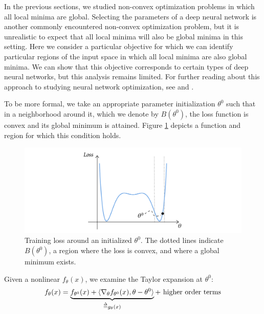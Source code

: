 


In the previous sections, we studied non-convex optimization problems in which all local minima are global. Selecting the parameters of a deep neural network is another commonly encountered non-convex optimization problem, but it is unrealistic to expect that all local minima will also be global minima in this setting. Here we consider a particular objective for which we can identify particular regions of the input space in which all local minima are also global minima. We can show that this objective corresponds to certain types of deep neural networks, but this analysis remains limited. For further reading about this approach to studying neural network optimization, see \cite{liang2018adding} and \cite{du2019gradient}.


To be more formal, we take an appropriate parameter initialization $\theta^0$ such that in a neighborhood around it, which we denote by $B(\theta^0)$, the loss function is convex and its global minimum is attained. Figure \ref{lec13:fig:NTKapproach} depicts a function and region for which this condition holds. 

\begin{figure}[ht]
    \centering
    \includegraphics[scale=0.3]{figures/ntk_initialization.png}
    \caption{Training loss around an initialized $\theta^0$. The dotted lines indicate $B(\theta^0)$, a region where the loss is convex, and where a global minimum exists.}
    \label{lec13:fig:NTKapproach}
\end{figure}


Given a nonlinear $f_\theta(x)$, we examine the Taylor expansion at $\theta^0$: 
\begin{align} 
    f_\theta(x) = \underbrace{f_{\theta^0}(x) + \langle \nabla_\theta f_{\theta^0}(x),\theta-\theta^0 \rangle}_{\defeq g_\theta(x)} + \text{ higher order terms}
\end{align} 

